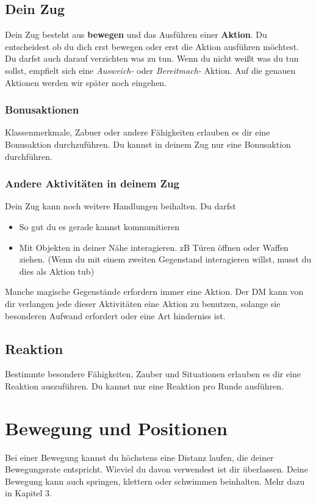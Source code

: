 \subsection{Dein Zug}
Dein Zug besteht aus \textbf{bewegen} und das Ausführen einer \textbf{Aktion}. Du entscheidest ob du dich erst bewegen oder erst die Aktion ausführen möchtest. Du darfst auch darauf verzichten was zu tun. Wenn du nicht weißt was du tun sollst, empfielt sich eine \textit{Ausweich-} oder \textit{Bereitmach-} Aktion. Auf die genauen Aktionen werden wir später noch eingehen.

\subsubsection{Bonusaktionen}
Klassenmerkmale, Zabuer oder andere Fähigkeiten erlauben es dir eine Bonusaktion durchzuführen. Du kannst in deinem Zug nur eine Bonusaktion durchführen.

\subsubsection{Andere Aktivitäten in deinem Zug}
Dein Zug kann noch weitere Handlungen beihalten. Du darfst
\begin{itemize}
  \item So gut du es gerade kannst kommunitieren
  \item Mit Objekten in deiner Nähe interagieren. zB Türen öffnen oder Waffen ziehen. (Wenn du mit einem zweiten Gegenstand interagieren willst, musst du dies als Aktion tub)
\end{itemize}
Manche magische Gegenstände erfordern immer eine Aktion. Der DM kann von dir verlangen jede dieser Aktivitäten eine Aktion zu benutzen, solange sie besonderen Aufwand erfordert oder eine Art hinderniss ist.

\subsection{Reaktion}
Bestimmte besondere Fähigkeiten, Zauber und Situationen erlauben es dir eine Reaktion auszuführen. Du kannst nur eine Reaktion pro Runde ausführen.

\section{Bewegung und Positionen}
Bei einer Bewegung kannst du höchstens eine Distanz laufen, die deiner Bewegungsrate entspricht. Wieviel du davon verwendest ist dir überlassen. Deine Bewegung kann auch springen, klettern oder schwimmen beinhalten. Mehr dazu in Kapitel 3.
